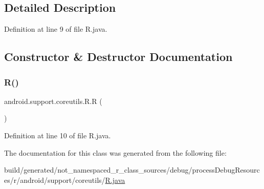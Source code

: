 \subsection{Detailed Description}


Definition at line 9 of file R.\+java.



\subsection{Constructor \& Destructor Documentation}
\mbox{\label{classandroid_1_1support_1_1coreutils_1_1_r_a8b937fa0ffc3844f88768f1241763f97}} 
\subsubsection{\texorpdfstring{R()}{R()}}
{\footnotesize\ttfamily android.\+support.\+coreutils.\+R.\+R (\begin{DoxyParamCaption}{ }\end{DoxyParamCaption})\hspace{0.3cm}{\ttfamily [private]}}



Definition at line 10 of file R.\+java.


\begin{DoxyCode}{0}

\end{DoxyCode}


The documentation for this class was generated from the following file\+:\begin{DoxyCompactItemize}
\item 
build/generated/not\+\_\+namespaced\+\_\+r\+\_\+class\+\_\+sources/debug/process\+Debug\+Resources/r/android/support/coreutils/\mbox{\hyperlink{android_2support_2coreutils_2_r_8java}{R.\+java}}\end{DoxyCompactItemize}
